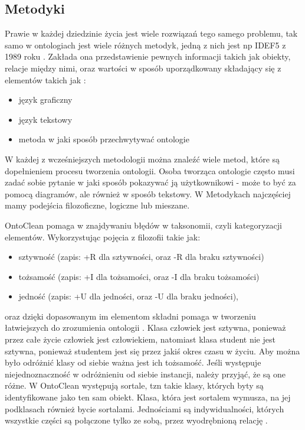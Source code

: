 \documentclass[a4paper,12pt, twoside]{book} %
\begin{document}
\subsection{Metodyki}

Prawie w każdej dziedzinie życia jest wiele rozwiązań tego samego problemu, tak samo w ontologiach jest wiele różnych metodyk, jedną z nich jest np IDEF5 z 1989 roku \cite{repr_inf}. Zakłada ona przedstawienie pewnych informacji takich jak obiekty, relacje między nimi, oraz wartości w sposób uporządkowany składający się z elementów takich jak \cite{wikipediaIDEF5}:
\begin{itemize}
	\item język graficzny
	\item język tekstowy
	\item metoda w jaki sposób przechwytywać ontologie
\end{itemize}

W każdej z wcześniejszych metodologii można znaleźć wiele metod, które są dopełnieniem procesu tworzenia ontologii. Osoba tworząca ontologie często musi zadać sobie pytanie w jaki sposób pokazywać ją użytkownikowi - może to być za pomocą diagramów, ale również w sposób tekstowy. W Metodykach najczęściej mamy podejścia filozoficzne, logiczne lub mieszane. 

OntoClean pomaga w znajdywaniu błędów w taksonomii, czyli kategoryzacji elementów. Wykorzystując pojęcia z filozofii takie jak:
\begin{itemize}
	\item sztywność (zapis: +R dla sztywności, oraz -R dla braku sztywności)
	\item tożsamość (zapis: +I dla tożsamości, oraz -I dla braku tożsamości)
	\item jedność (zapis: +U dla jedności, oraz -U dla braku jedności),
\end{itemize}
oraz dzięki dopasowanym im elementom składni pomaga w tworzeniu łatwiejszych do zrozumienia ontologii \cite{fil_1}\cite{fil_2}. Klasa człowiek jest sztywna, ponieważ przez całe życie człowiek jest człowiekiem, natomiast klasa student nie jest sztywna, ponieważ studentem jest się przez jakiś okres czasu w życiu. Aby można było odróżnić klasy od siebie ważna jest ich tożsamość. Jeśli występuje niejednoznaczność w odróżnieniu od siebie instancji, należy przyjąć, że są one różne. W OntoClean występują sortale, tzn takie klasy, których byty są identyfikowane jako ten sam obiekt. Klasa, która jest sortalem wymusza, na jej podklasach również bycie sortalami. Jednościami są indywidualności, których wszystkie części są połączone tylko ze sobą, przez wyodrębnioną relację \cite{OntoClean}.
\end{document}
